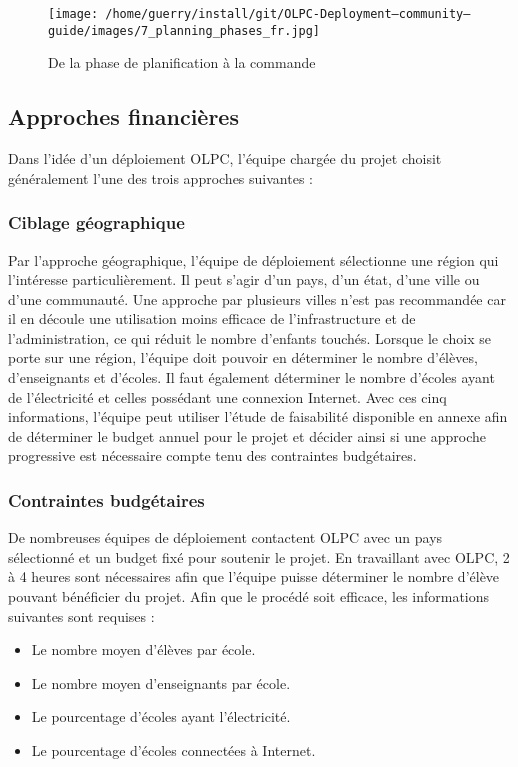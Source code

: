 \documentclass[11pt]{article}
\begin{document}
\begin{figure}[htb]
\centering
\texttt{[image: /home/guerry/install/git/OLPC-Deployment--community--guide/images/7\_planning\_phases\_fr.jpg]}
\caption{De la phase de planification à la commande}
\end{figure}
\subsection{Approches financières}
\label{sec-6-1}


Dans l'idée d'un déploiement OLPC, l'équipe chargée du projet choisit
généralement l'une des trois approches suivantes :
\subsubsection{Ciblage géographique}
\label{sec-6-1-1}


Par l'approche géographique, l'équipe de déploiement sélectionne une région
qui l'intéresse particulièrement. Il peut s'agir d'un pays, d'un état,
d'une ville ou d'une communauté. Une approche par plusieurs villes n'est
pas recommandée car il en découle une utilisation moins efficace de
l'infrastructure et de l'administration, ce qui réduit le nombre d'enfants
touchés. Lorsque le choix se porte sur une région, l'équipe doit pouvoir en
déterminer le nombre d'élèves, d'enseignants et d'écoles. Il faut également
déterminer le nombre d'écoles ayant de l'électricité et celles possédant
une connexion Internet. Avec ces cinq informations, l'équipe peut utiliser
l'étude de faisabilité disponible en annexe afin de déterminer le budget
annuel pour le projet et décider ainsi si une approche progressive est
nécessaire compte tenu des contraintes budgétaires.
\subsubsection{Contraintes budgétaires}
\label{sec-6-1-2}


De nombreuses équipes de déploiement contactent OLPC avec un pays
sélectionné et un budget fixé pour soutenir le projet. En travaillant avec
OLPC, 2 à 4 heures sont nécessaires afin que l'équipe puisse déterminer le
nombre d'élève pouvant bénéficier du projet. Afin que le procédé soit
efficace, les informations suivantes sont requises :

\begin{itemize}
\item Le nombre moyen d'élèves par école.
\item Le nombre moyen d'enseignants par école.
\item Le pourcentage d'écoles ayant l'électricité.
\item Le pourcentage d'écoles connectées à Internet.
\end{itemize}
\end{document}
